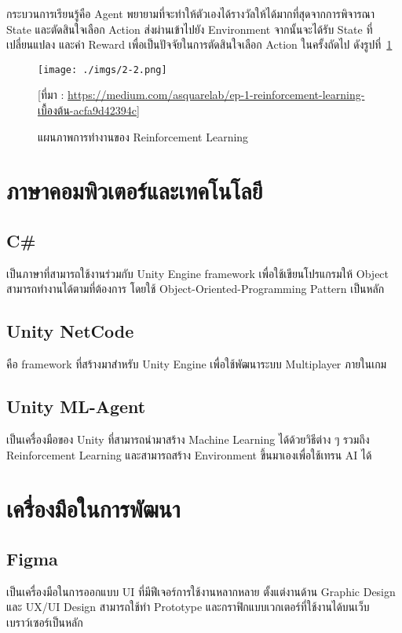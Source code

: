 \documentclass[12pt,oneside,openright,a4paper]{cpe-thai-project}
\begin{document}
กระบวนการเรียนรู้คือ Agent พยายามที่จะทำให้ตัวเองได้รางวัลให้ได้มากที่สุดจากการพิจารณา 
State และตัดสินใจเลือก Action ส่งผ่านเข้าไปยัง Environment จากนั้นจะได้รับ State 
ที่เปลี่ยนแปลง และค่า Reward เพื่อเป็นปัจจัยในการตัดสินใจเลือก Action ในครั้งถัดไป ดังรูปที่~\ref{fig:2-2}

\begin{figure}[H]\centering
  \texttt{[image: ./imgs/2-2.png]}
  \caption{แผนภาพการทำงานของ Reinforcement Learning}\label{fig:2-2}
  \small [ที่มา : \url{https://medium.com/asquarelab/ep-1-reinforcement-learning-เบื้องต้น-acfa9d42394c}]
\end{figure}

\pagebreak
\section{ภาษาคอมพิวเตอร์และเทคโนโลยี}

\subsection{C\#}
เป็นภาษาที่สามารถใช้งานร่วมกับ Unity Engine framework 
เพื่อใช้เขียนโปรแกรมให้ Object สามารถทำงานได้ตามที่ต้องการ 
โดยใช้ Object-Oriented-Programming Pattern เป็นหลัก
\subsection{Unity NetCode}
คือ framework ที่สร้างมาสำหรับ Unity Engine เพื่อใช้พัฒนาระบบ 
Multiplayer ภายในเกม 
\subsection{Unity ML-Agent}
เป็นเครื่องมือของ Unity ที่สามารถนำมาสร้าง Machine Learning 
ได้ด้วยวิธีต่าง ๆ รวมถึง Reinforcement Learning และสามารถสร้าง 
Environment ขึ้นมาเองเพื่อใช้เทรน AI ได้


\section{เครื่องมือในการพัฒนา}

\subsection{Figma}
เป็นเครื่องมือในการออกแบบ UI ที่มีฟีเจอร์การใช้งานหลากหลาย 
ตั้งแต่งานด้าน Graphic Design และ UX/UI Design สามารถใช้ทำ 
Prototype และกราฟิกแบบเวกเตอร์ที่ใช้งานได้บนเว็บเบราว์เซอร์เป็นหลัก 
\end{document}
